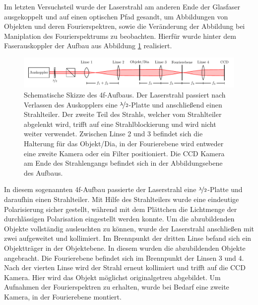 
Im letzten Versuchsteil wurde der Laserstrahl am anderen Ende der Glasfaser ausgekoppelt und auf einen optischen Pfad gesandt, um Abbildungen von Objekten und deren Fourierspektren, sowie die Veränderung der Abbildung bei Maniplation des Fourierspektrums zu beobachten. Hierfür wurde hinter dem Faserauskoppler der Aufbau aus Abbildung \ref{fig:4f-aufbau} realisiert.

\begin{figure}[h]
	\centering
	\includegraphics[width=1\linewidth]{graphs/versuchsaufbau/4f-aufbau.pdf}
	\caption[Schematische Skizze des 4f-Aufbaus]{
		Schematische Skizze des 4f-Aufbaus. Der Laserstrahl passiert nach Verlassen des Auskopplers eine $\nicefrac{\lambda}{2}$-Platte und anschließend einen Strahlteiler. Der zweite Teil des Strahls, welcher vom Strahlteiler abgelenkt wird, trifft auf eine Strahlblockierung und wird nicht weiter verwendet. Zwischen Linse 2 und 3 befindet sich die Halterung für das Objekt/Dia, in der Fourierebene wird entweder eine zweite Kamera oder ein Filter positioniert. Die CCD Kamera am Ende des Strahlengangs befindet sich in der Abbildungsebene des Aufbaus.
	}
	\label{fig:4f-aufbau}
\end{figure}

In diesem sogenannten 4f-Aufbau passierte der Laserstrahl eine $\nicefrac{\lambda}{2}$-Platte und daraufhin einen Strahlteiler. Mit Hilfe des Strahlteilers wurde eine eindeutige Polarisierung sicher gestellt, während mit dem Plättchen die Lichtmenge der durchlässigen Polarisation eingestellt werden konnte. Um die abzubildenden Objekte vollständig ausleuchten zu können, wurde der Laserstrahl anschließen mit zwei aufgeweitet und kollimiert. Im Brennpunkt der dritten Linse befand sich ein Objektträger in der Objektebene. In diesem wurden die abzubildenden Objekte angebracht. Die Fourierebene befindet sich im Brennpunkt der Linsen 3 und 4. Nach der vierten Linse wird der Strahl erneut kollimiert und trifft auf die CCD Kamera. Hier wird das Objekt möglichst originalgetreu abgebildet. Um Aufnahmen der Fourierspektren zu erhalten, wurde bei Bedarf eine zweite Kamera, in der Fourierebene montiert. \\ 

